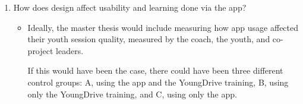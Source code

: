 \begin{enumerate}
    \item How does design affect usability and learning done via the app? %
    \begin{itemize}
        \item Ideally, the master thesis would include measuring how app usage affected their youth session quality, measured by the coach, the youth, and co-project leaders.

        If this would have been the case, there could have been three different control groups: A, using the app and the YoungDrive training, B, using only the YoungDrive training, and C, using only the app.
    \end{itemize}

\end{enumerate}




